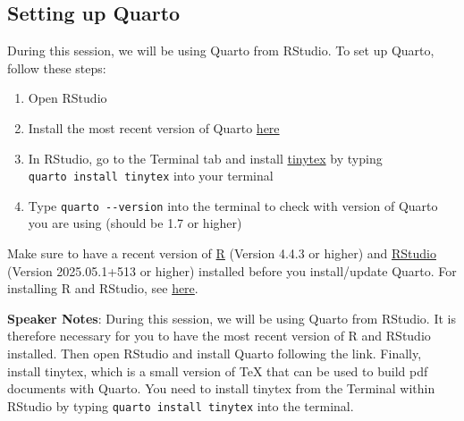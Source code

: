 \documentclass[
  letterpaper,
  DIV=11,
  numbers=noendperiod]{scrartcl}
\providecommand{\tightlist}{%
  \setlength{\itemsep}{0pt}\setlength{\parskip}{0pt}}
\begin{document}
\subsection{Setting up Quarto}\label{setting-up-quarto}

During this session, we will be using Quarto from RStudio. To set up
Quarto, follow these steps:

\begin{enumerate}
\def\labelenumi{\arabic{enumi}.}
\tightlist
\item
  Open RStudio
\item
  Install the most recent version of Quarto
  \href{https://quarto.org/docs/download/release.html}{here}
\item
  In RStudio, go to the Terminal tab and install
  \href{https://quarto.org/docs/output-formats/pdf-engine.html\#installing-tex}{tinytex}
  by typing \texttt{quarto\ install\ tinytex} into your terminal
\item
  Type \texttt{quarto\ -\/-version} into the terminal to check with
  version of Quarto you are using (should be 1.7 or higher)
\end{enumerate}

\begin{tcolorbox}[enhanced jigsaw, opacitybacktitle=0.6, toptitle=1mm, colbacktitle=quarto-callout-important-color!10!white, toprule=.15mm, left=2mm, colback=white, colframe=quarto-callout-important-color-frame, opacityback=0, bottomtitle=1mm, breakable, titlerule=0mm, rightrule=.15mm, arc=.35mm, title=\textcolor{quarto-callout-important-color}{\faExclamation}\hspace{0.5em}{Important}, bottomrule=.15mm, coltitle=black, leftrule=.75mm]

Make sure to have a recent version of
\href{https://www.r-project.org/}{R} (Version 4.4.3 or higher) and
\href{https://posit.co/download/rstudio-desktop/}{RStudio} (Version
2025.05.1+513 or higher) installed before you install/update Quarto. For
installing R and RStudio, see
\href{https://posit.co/download/rstudio-desktop/}{here}.

\end{tcolorbox}

\textbf{Speaker Notes}: During this session, we will be using Quarto
from RStudio. It is therefore necessary for you to have the most recent
version of R and RStudio installed. Then open RStudio and install Quarto
following the link. Finally, install tinytex, which is a small version
of TeX that can be used to build pdf documents with Quarto. You need to
install tinytex from the Terminal within RStudio by typing
\texttt{quarto\ install\ tinytex} into the terminal.
\end{document}

